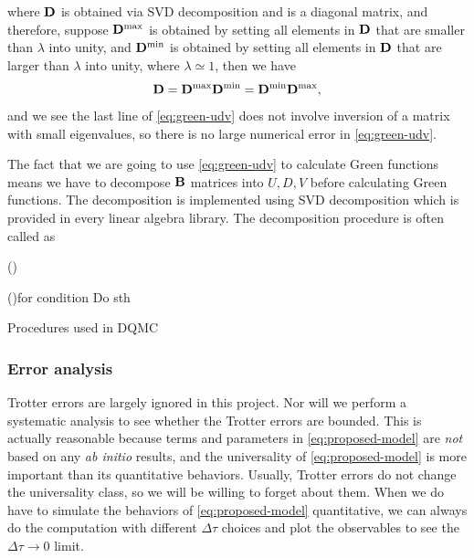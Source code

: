 \documentclass[hyperref, a4paper]{article}
\begin{document}
where $\vb{D}$ is obtained via SVD decomposition and is a diagonal matrix, and therefore, suppose
$\vb{D}^\text{max}$ is obtained by setting all elements in $\vb{D}$ that are smaller than $\lambda$
into unity, and $\vb{D}^\text{min}$ is obtained by setting all elements in $\vb{D}$ that are larger 
than $\lambda$ into unity, where $\lambda \simeq 1$, then we have 
\[
    \vb{D} = \vb{D}^\text{max} \vb{D}^\text{min} = \vb{D}^\text{min} \vb{D}^\text{max},
\]
and we see the last line of \eqref{eq:green-udv} does not involve inversion of a matrix with small eigenvalues,
so there is no large numerical error in \eqref{eq:green-udv}.

The fact that we are going to use \eqref{eq:green-udv} to calculate Green functions means we have to decompose
$\vb{B}$ matrices into $U, D, V$ before calculating Green functions. The decomposition is implemented using 
SVD decomposition which is provided in every linear algebra library. The decomposition procedure is often called 
as 

\begin{algorithm}

    \DontPrintSemicolon
    \SetAlgoLined

    \Function(){}{

    \For(){for condition}{
        Do sth 
    }

    
    \;
    }

    \caption{Procedures used in DQMC}
    \label{alg:procedures}
\end{algorithm}

\subsubsection{Error analysis}

Trotter errors are largely ignored in this project. Nor will we perform a systematic analysis to see whether the Trotter errors are bounded.
This is actually reasonable because terms and parameters in \eqref{eq:proposed-model} are \emph{not} based on any \emph{ab initio} results, and the universality of \eqref{eq:proposed-model} is more important than its quantitative behaviors.
Usually, Trotter errors do not change the universality class, so we will be willing to forget about them.
When we do have to simulate the behaviors of \eqref{eq:proposed-model} quantitative, we can always do the computation with different $\Delta \tau$ choices and plot the observables to see the $\Delta \tau \to 0$ limit.
\end{document}

